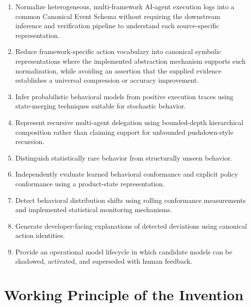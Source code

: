 \documentclass[11pt,a4paper]{article}
\begin{document}
\begin{enumerate}[leftmargin=1.6em, itemsep=0.6em]

\item Normalize heterogeneous, multi-framework AI-agent execution logs into a common
Canonical Event Schema without requiring the downstream inference and verification
pipeline to understand each source-specific representation.

\item Reduce framework-specific action vocabulary into canonical symbolic representations
where the implemented abstraction mechanism supports such normalization, while avoiding
an assertion that the supplied evidence establishes a universal compression or accuracy
improvement.

\item Infer probabilistic behavioral models from positive execution traces using
state-merging techniques suitable for stochastic behavior.

\item Represent recursive multi-agent delegation using bounded-depth hierarchical
composition rather than claiming support for unbounded pushdown-style recursion.

\item Distinguish statistically rare behavior from structurally unseen behavior.

\item Independently evaluate learned behavioral conformance and explicit policy
conformance using a product-state representation.

\item Detect behavioral distribution shifts using rolling conformance measurements and
implemented statistical monitoring mechanisms.

\item Generate developer-facing explanations of detected deviations using canonical
action identities.

\item Provide an operational model lifecycle in which candidate models can be shadowed,
activated, and superseded with human feedback.

\end{enumerate}

\section{Working Principle of the Invention}
\end{document}

